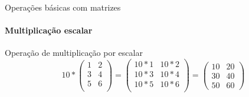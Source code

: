 \begin{frame}[t]{Operações básicas com matrizes} 
    \framesubtitle{Multiplicação escalar}

    Operação de multiplicação por escalar
    \begin{equation}
        10
        *
        \begin{pmatrix}
            1 & 2 \\
            3 & 4 \\
            5 & 6 \\
        \end{pmatrix}
        =
        \begin{pmatrix}
            10 * 1  & 10 * 2  \\
            10 * 3  & 10 * 4  \\
            10 * 5  & 10 * 6  \\
        \end{pmatrix}
        =
        \begin{pmatrix}
            10  & 20 \\
            30  & 40\\
            50  & 60 
        \end{pmatrix}
    \end{equation}
    \vspace*{0.3cm}
\end{frame}
